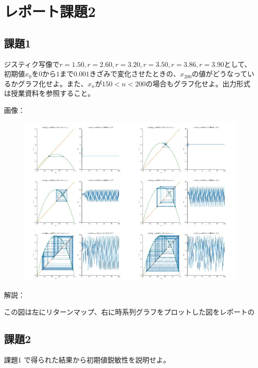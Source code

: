 \section{レポート課題2}
\subsection{課題1}
ジスティク写像で$r = 1.50, r = 2.60, r = 3.20, r = 3.50, r = 3.86, r = 3.90$として、初期値$x_0$を$0$から$1$まで$0.001$きざみで変化させたときの、$x_{200}$の値がどうなっているかグラフ化せよ。また、$x_n$が$150 < n < 200$の場合もグラフ化せよ。出力形式は授業資料を参照すること。\par
画像：
\begin{figure}[h]
  \includegraphics[width=15cm]{images/ctest2.jpg}
\end{figure}

解説：\par
この図は左にリターンマップ、右に時系列グラフをプロットした図をレポートの

\subsection{課題2}
課題1 で得られた結果から初期値鋭敏性を説明せよ。